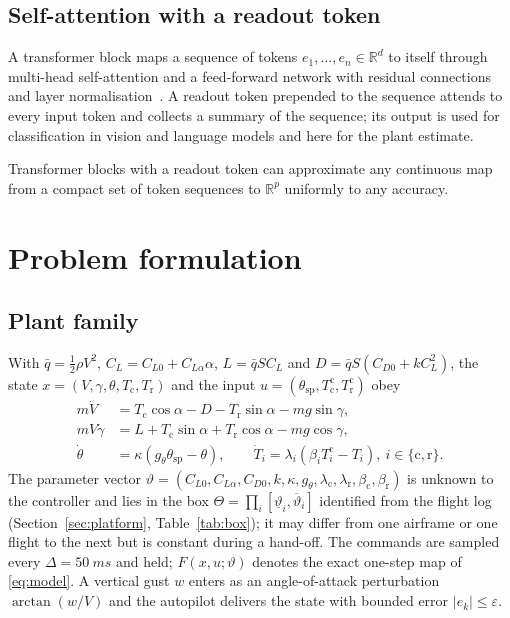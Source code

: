 \documentclass[final,5p,times,twocolumn]{elsarticle}
\newcommand{\gth}{g_\theta}\newcommand{\thsp}{\theta_{\mathrm{sp}}}\newcommand{\lf}{\Lambda}
\begin{document}
\subsection{Self-attention with a readout token}
A transformer block maps a sequence of tokens $e_1,\dots,e_n\in\mathbb R^d$ to itself through multi-head self-attention and a feed-forward network with residual connections and layer normalisation~\cite{Vaswani2017}. A readout token prepended to the sequence attends to every input token and collects a summary of the sequence; its output is used for classification in vision and language models and here for the plant estimate.
\begin{fact}\label{fact:ua}
Transformer blocks with a readout token can approximate any continuous map from a compact set of token sequences to $\mathbb R^p$ uniformly to any accuracy.
\end{fact}



\section{Problem formulation}\label{sec:problem}
\subsection{Plant family}
With $\bar q=\tfrac12\rho V^2$, $C_L=C_{L0}+C_{L\alpha}\alpha$, $L=\bar qSC_L$ and $D=\bar qS(C_{D0}+kC_L^2)$, the state $x=(V,\gamma,\theta,T_{\mathrm c},T_{\mathrm r})$ and the input $u=(\thsp,T^{\mathrm c}_{\mathrm c},T^{\mathrm c}_{\mathrm r})$ obey
\begin{subequations}\label{eq:model}
\begin{align}
m\dot V&=T_{\mathrm c}\cos\alpha-D-T_{\mathrm r}\sin\alpha-mg\sin\gamma,\label{eq:V}\\
mV\dot\gamma&=L+T_{\mathrm c}\sin\alpha+T_{\mathrm r}\cos\alpha-mg\cos\gamma,\label{eq:gam}\\
\dot\theta&=\kappa(\gth\thsp-\theta),\qquad\dot T_i=\lambda_i(\beta_iT^{\mathrm c}_i-T_i),\ i\in\{\mathrm c,\mathrm r\}.\label{eq:fast}
\end{align}
\end{subequations}
The parameter vector $\vartheta=(C_{L0},C_{L\alpha},C_{D0},k,\kappa,\gth,\lambda_{\mathrm c},\lambda_{\mathrm r},\beta_{\mathrm c},\beta_{\mathrm r})$ is unknown to the controller and lies in the box $\Theta=\prod_i[\underline\vartheta_i,\overline\vartheta_i]$ identified from the flight log (Section~\ref{sec:platform}, Table~\ref{tab:box}); it may differ from one airframe or one flight to the next but is constant during a hand-off. The commands are sampled every $\Delta=\SI{50}{ms}$ and held; $F(x,u;\vartheta)$ denotes the exact one-step map of \eqref{eq:model}. A vertical gust $w$ enters as an angle-of-attack perturbation $\arctan(w/V)$ and the autopilot delivers the state with bounded error $|e_k|\le\varepsilon$.
\end{document}

